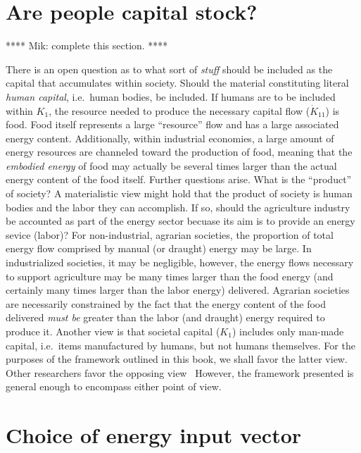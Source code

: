 \section{Are people capital stock?}
\label{sec:people_as_stock}

**** Mik: complete this section. ****

There is an open
question as to what sort of \emph{stuff} 
should be included as the capital
that accumulates within society. 
Should the material constituting literal
\emph{human capital}, 
i.e.~human bodies, 
be included. 
If humans are to be included within $K_{1}$, 
the resource needed to produce the necessary capital
flow ($\dot{K}_{11}$) is food. 
Food itself represents a large ``resource''
flow and has a large associated energy content. 
Additionally, 
within industrial economies, 
a large amount of energy resources 
are channeled toward the production of food, 
meaning that the \emph{embodied energy}
of food may actually be several times larger than
the actual energy content of the food itself. 
Further questions arise. 
What is the ``product'' of society? 
A materialistic view might hold that the product of
society is human bodies and the labor they can accomplish. 
If so, 
should the agriculture industry 
be accounted as part of the energy sector 
becuase its aim is to provide 
an energy sevice (labor)? 
For non-industrial, agrarian societies, 
the proportion of total energy flow 
comprised by manual (or draught) energy 
may be large. 
In industrialized societies, 
it may be negligible, 
however, 
the energy flows necessary to support agriculture
may be many times larger than the food energy
(and certainly many times larger 
than the labor energy) 
delivered. 
Agrarian societies
are necessarily constrained by the fact that the energy content of the food delivered 
\emph{must be} greater than the labor (and draught) energy required to produce it.
Another view is that societal capital ($K_{1}$) includes only man-made capital, 
i.e.\ items manufactured by humans,
but not humans themselves. 
For the purposes of the framework outlined in this book, 
we shall favor the latter view.
Other researchers favor the opposing view~\cite{Giampietro2013}
However,
the framework presented is general enough to encompass either point of view.


\section{Choice of energy input vector}
\label{sec:energy_input_vector}

